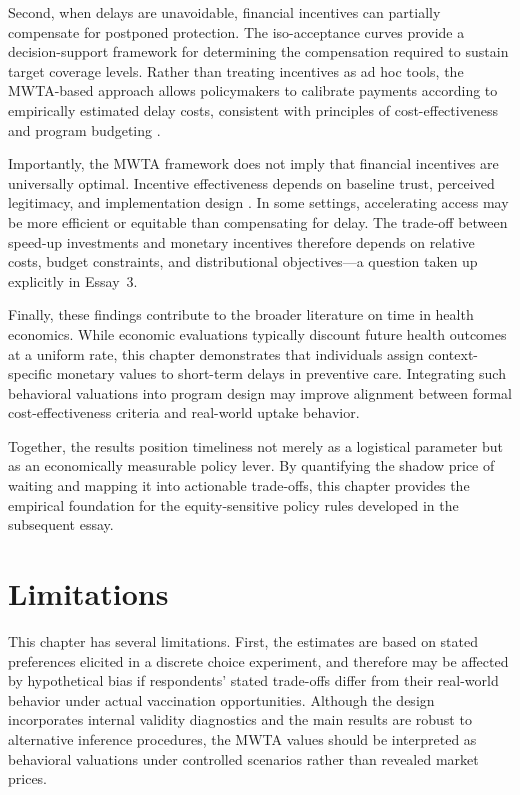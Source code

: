 \documentclass[doublespacing]{utdthesis}
\let\cite=\citep
\begin{document}
Second, when delays are unavoidable, financial incentives can partially compensate for postponed protection. The iso-acceptance curves provide a decision-support framework for determining the compensation required to sustain target coverage levels. Rather than treating incentives as ad hoc tools, the MWTA-based approach allows policymakers to calibrate payments according to empirically estimated delay costs, consistent with principles of cost-effectiveness and program budgeting \cite{Drummond2015}. 

Importantly, the MWTA framework does not imply that financial incentives are universally optimal. Incentive effectiveness depends on baseline trust, perceived legitimacy, and implementation design \cite{Gneezy2011}. In some settings, accelerating access may be more efficient or equitable than compensating for delay. The trade-off between speed-up investments and monetary incentives therefore depends on relative costs, budget constraints, and distributional objectives—a question taken up explicitly in Essay~3.

Finally, these findings contribute to the broader literature on time in health economics. While economic evaluations typically discount future health outcomes at a uniform rate, this chapter demonstrates that individuals assign context-specific monetary values to short-term delays in preventive care. Integrating such behavioral valuations into program design may improve alignment between formal cost-effectiveness criteria and real-world uptake behavior.

Together, the results position timeliness not merely as a logistical parameter but as an economically measurable policy lever. By quantifying the shadow price of waiting and mapping it into actionable trade-offs, this chapter provides the empirical foundation for the equity-sensitive policy rules developed in the subsequent essay.


\section{Limitations}
\label{sec:essay2_limitations}

This chapter has several limitations. First, the estimates are based on stated preferences elicited in a discrete choice experiment, and therefore may be affected by hypothetical bias if respondents’ stated trade-offs differ from their real-world behavior under actual vaccination opportunities. Although the design incorporates internal validity diagnostics and the main results are robust to alternative inference procedures, the MWTA values should be interpreted as behavioral valuations under controlled scenarios rather than revealed market prices.
\end{document}
